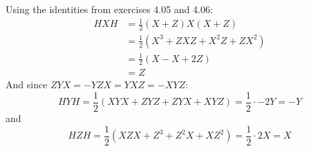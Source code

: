 \begingroup
%
\par Using the identities from exercises 4.05 and 4.06:
%
\begin{align*}
H X H &= \frac12 \left( X + Z \right) X \left( X + Z \right) \\
&= \frac12 \left( X^3 + ZXZ + X^2 Z + Z X^2 \right) \\
&= \frac12 \left( X - X + 2Z \right) \\
&= Z
\end{align*}
%
And since $ZYX = -YZX = YXZ = -XYZ$:
%
$$
H Y H = \frac12 \left( XYX + ZYZ + ZYX + XYZ \right) = \frac12 \cdot -2 Y = -Y
$$
%
and
$$
H Z H = \frac12 \left( XZX + Z^3 + Z^2 X + X Z^2 \right) = \frac12 \cdot 2X = X
$$
\endgroup
